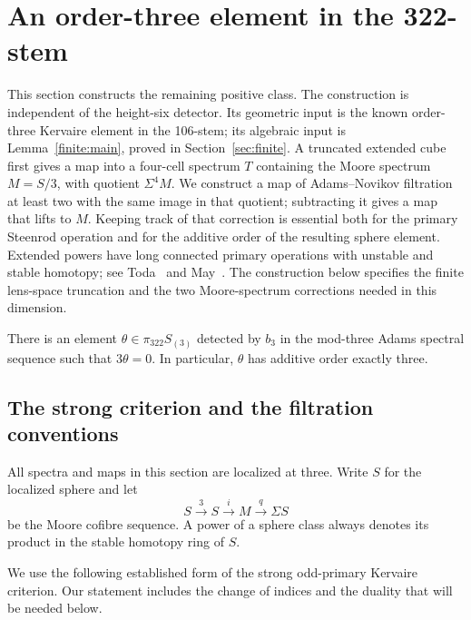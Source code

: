 \section{An order-three element in the 322-stem}
\label{sec:cube}

This section constructs the remaining positive class.  The construction is
independent of the height-six detector.  Its geometric input is the known
order-three Kervaire element in the 106-stem; its algebraic input is
Lemma~\ref{finite:main}, proved in Section~\ref{sec:finite}.  A truncated
extended cube first gives a map into a four-cell spectrum \(T\) containing
the Moore spectrum \(M=S/3\), with quotient \(\Sigma^4M\).  We construct
a map of Adams--Novikov filtration at least two with the same image in
that quotient; subtracting it gives a map that lifts to \(M\).  Keeping
track of that correction is essential both for the primary Steenrod
operation and for the additive order of the resulting sphere element.
Extended powers have long connected primary operations with unstable
and stable homotopy; see Toda~\cite{TodaExtended} and
May~\cite[Sections~2--3]{MayOperations}.
The construction below specifies the finite lens-space truncation
and the two Moore-spectrum corrections needed in this dimension.

\begin{theorem}\label{cube:order-three}
There is an element \(\theta\in\pi_{322}S_{(3)}\) detected by \(b_3\) in the
mod-three Adams spectral sequence such that \(3\theta=0\).
In particular, \(\theta\) has additive order exactly three.
\end{theorem}

\subsection{The strong criterion and the filtration conventions}

All spectra and maps in this section are localized at three.  Write \(S\)
for the localized sphere and let
\begin{equation}\label{cube:moore-triangle}
 S\xrightarrow{3}S\xrightarrow{i}M\xrightarrow{q}\Sigma S
\end{equation}
be the Moore cofibre sequence.  A power of a sphere class always denotes
its product in the stable homotopy ring of \(S\).

We use the following established form of the strong odd-primary Kervaire
criterion.  Our statement includes the change of indices and the duality
that will be needed below.

